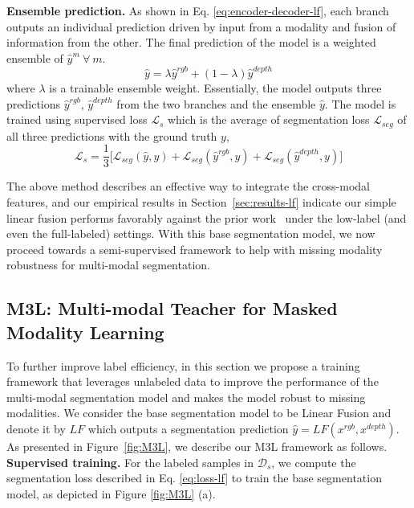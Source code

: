 \documentclass[10pt,twocolumn,letterpaper]{article}
\begin{document}
\noindent\textbf{Ensemble prediction.} As shown in Eq. \ref{eq:encoder-decoder-lf}, each branch outputs an individual prediction driven by input from a modality and fusion of information from the other. The final prediction of the model is a weighted ensemble of $\hat{y}^m ~\forall~ m$. 
\begin{equation}
    \hat{y} = \lambda \hat{y}^{rgb} + (1-\lambda)\hat{y}^{depth}
    \label{eq:ensemble-lf}
\end{equation}
where $\lambda$ is a trainable ensemble weight. Essentially, the model outputs three predictions $\hat{y}^{rgb}$, $\hat{y}^{depth}$ from the two branches and the ensemble $\hat{y}$. The model is trained using supervised loss $\mathcal{L}_s$ which is the average of segmentation loss $\mathcal{L}_{seg}$ of all three predictions with the ground truth $y$,
\begin{equation}
    \mathcal{L}_s = \frac{1}{3}\Big[\mathcal{L}_{seg}(\hat{y}, y) + \mathcal{L}_{seg}(\hat{y}^{rgb}, y) + \mathcal{L}_{seg}(\hat{y}^{depth}, y)\Big]
    \label{eq:loss-lf}
\end{equation}


The above method describes an effective way to integrate the cross-modal features, and our empirical results in Section~\ref{sec:results-lf} indicate our simple linear fusion performs favorably against the prior work~\cite{tokenfusion} under the low-label (and even the full-labeled)
settings.
With this base segmentation model, we now proceed towards a semi-supervised framework to help with missing modality robustness for multi-modal segmentation.


\subsection{M3L: Multi-modal Teacher for Masked Modality Learning}
\label{sec:method-M3L}
To further improve label efficiency, in this section we propose a training framework that leverages unlabeled data to improve the performance of the multi-modal segmentation model and makes the model robust to missing modalities. We consider the base segmentation model to be Linear Fusion and denote it by $LF$ which outputs a segmentation prediction $\hat{y} = LF(x^{rgb}, x^{depth})$.
As presented in Figure~\ref{fig:M3L}, we describe our M3L framework as follows.\\


\noindent\textbf{Supervised training.} For the labeled samples in $\mathcal{D}_s$, we compute the segmentation loss described in Eq. \ref{eq:loss-lf} to train the base segmentation model, as depicted in Figure \ref{fig:M3L} (a). \\
\end{document}
